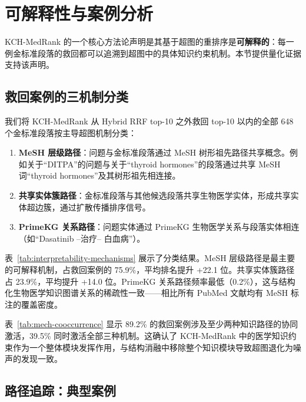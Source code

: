 \section{可解释性与案例分析}
\label{sec:interpretability}

KCH-MedRank 的一个核心方法论声明是其基于超图的重排序是\textbf{可解释的}：每一例金标准段落的救回都可以追溯到超图中的具体知识约束机制。本节提供量化证据支持该声明。

\subsection{救回案例的三机制分类}

我们将 KCH-MedRank 从 Hybrid RRF top-10 之外救回 top-10 以内的全部 648 个金标准段落按主导超图机制分类：

\begin{enumerate}[label=(\arabic*)]
    \item \textbf{MeSH 层级路径}：问题与金标准段落通过 MeSH 树形祖先路径共享概念。例如关于``DITPA''的问题与关于``thyroid hormones''的段落通过共享 MeSH 词``thyroid hormones''及其树形祖先相连接。
    \item \textbf{共享实体簇路径}：金标准段落与其他候选段落共享生物医学实体，形成共享实体超边簇，通过扩散传播排序信号。
    \item \textbf{PrimeKG 关系路径}：问题实体通过 PrimeKG 生物医学关系与段落实体相连（如``Dasatinib --治疗-- 白血病''）。
\end{enumerate}



表~\ref{tab:interpretability-mechanisms} 展示了分类结果。MeSH 层级路径是最主要的可解释机制，占救回案例的 75.9\%，平均排名提升 +22.1 位。共享实体簇路径占 23.9\%，平均提升 +14.0 位。PrimeKG 关系路径频率最低（0.2\%），这与结构化生物医学知识图谱关系的稀疏性一致——相比所有 PubMed 文献均有 MeSH 标注的覆盖密度。

表~\ref{tab:mech-cooccurrence} 显示 89.2\% 的救回案例涉及至少两种知识路径的协同激活，39.5\% 同时激活全部三种机制。这确认了 KCH-MedRank 中的医学知识约束作为一个整体模块发挥作用，与结构消融中移除整个知识模块导致超图退化为噪声的发现一致。



\subsection{路径追踪：典型案例}




